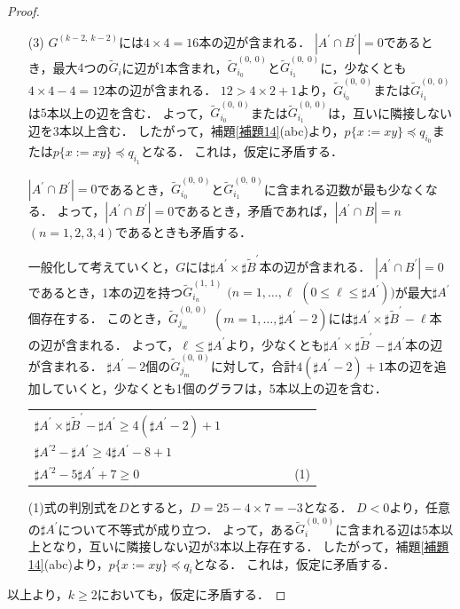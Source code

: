 \begin{proof}
\begin{enumerate}
\item[\textrm{(3)}]
$G^{(k-2,~k-2)}$には$4\times4=16$本の辺が含まれる．
$| A^{\prime} \cap B^{\prime} | = 0$であるとき，最大$4$つの$\tilde{G}_{i}$に辺が1本含まれ，$\tilde{G}^{(0,~0)}_{i_{0}}$と$\tilde{G}^{(0,~0)}_{i_{1}}$に，少なくとも$4 \times 4-4=12$本の辺が含まれる．
$12 > 4 \times 2 + 1$より，$\tilde{G}^{(0,~0)}_{i_{0}}$または$\tilde{G}^{(0,~0)}_{i_{1}}$は$5$本以上の辺を含む．
よって，$\tilde{G}^{(0,~0)}_{i_{0}}$または$\tilde{G}^{(0,~0)}_{i_{1}}$は，互いに隣接しない辺を3本以上含む．
したがって，補題\ref{補題14}(abc)より，$p \{x:=xy \} \preceq q_{i_{0}}$または$p \{x:=xy \} \preceq q_{i_{1}}$となる．
これは，仮定に矛盾する．  

$| A^{\prime} \cap B^{\prime} |=0$であるとき，$\tilde{G}^{(0,~0)}_{i_{0}}$と$\tilde{G}^{(0,~0)}_{i_{1}}$に含まれる辺数が最も少なくなる．
よって，$| A^{\prime} \cap B^{\prime} |=0$であるとき，矛盾であれば，$| A^{\prime} \cap B |=n$ $(n=1,2,3,4)$であるときも矛盾する．

一般化して考えていくと，$G$には$\sharp A^{\prime} \times \sharp\tilde{B}^{\prime}$本の辺が含まれる．
$| A^{\prime} \cap B^{\prime} |=0$であるとき，1本の辺を持つ$\tilde{G}^{(1,~1)}_{i_{n}}$ $(n=1,\ldots, \ell$ $(0 \le \ell \le \sharp A^{\prime}))$が最大$\sharp A^{\prime}$個存在する．
このとき，$\tilde{G}^{(0,~0)}_{j_{m}}$ $(m=1,\ldots, \sharp A^{\prime}-2)$には$\sharp A^{\prime} \times \sharp\tilde{B}^{\prime} - \ell$本の辺が含まれる．
よって，$\ell \le \sharp A^{\prime}$より，少なくとも$\sharp A^{\prime} \times \sharp\tilde{B}^{\prime} - \sharp A^{\prime}$本の辺が含まれる．
$\sharp A^{\prime}-2$個の$\tilde{G}^{(0,~0)}_{j_{m}}$に対して，合計$4(\sharp A^{\prime}-2) +1$本の辺を追加していくと，少なくとも1個のグラフは，5本以上の辺を含む．

\begin{center}
  \begin{tabular}{l}
  $\sharp A^{\prime} \times \sharp\tilde{B}^{\prime} -\sharp A^{\prime} \ge 4(\sharp A^{\prime}-2)+1$\\
  $\sharp A^{\prime 2}-\sharp A^{\prime} \ge 4\sharp A^{\prime}-8+1$\\
  $\sharp A^{\prime 2}-5\sharp A^{\prime}+7 \ge 0$~~~~~~~~~~~~~~~~~~~~~~~~~(1)
\end{tabular}
\end{center}


(1)式の判別式を$D$とすると，$D=25-4\times7=-3$となる．
$D<0$より，任意の$\sharp A^{\prime}$について不等式が成り立つ．
よって，ある$\tilde{G}^{(0,~0)}_{i}$に含まれる辺は5本以上となり，互いに隣接しない辺が3本以上存在する．
したがって，補題\ref{補題14}(abc)より，$p \{x:=xy \} \preceq q_{i}$となる．
これは，仮定に矛盾する．
\end{enumerate}

以上より，$k \ge 2$においても，仮定に矛盾する．
\end{proof}

